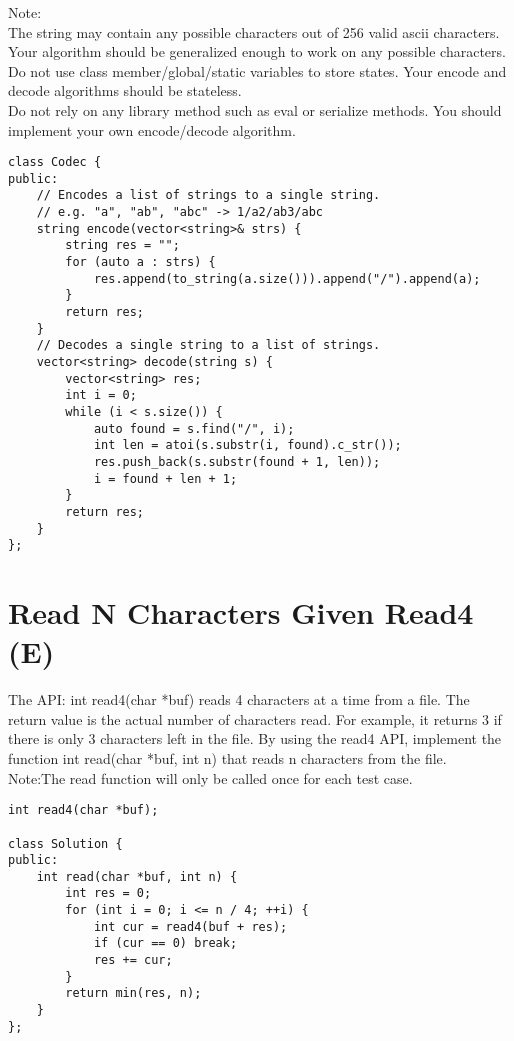 Note:\\
    The string may contain any possible characters out of 256 valid ascii characters. Your algorithm should be generalized enough to work on any possible characters.\\
    Do not use class member/global/static variables to store states. Your encode and decode algorithms should be stateless.\\
    Do not rely on any library method such as eval or serialize methods. You should implement your own encode/decode algorithm.\\

\begin{lstlisting}
class Codec {
public:
    // Encodes a list of strings to a single string.
    // e.g. "a", "ab", "abc" -> 1/a2/ab3/abc
    string encode(vector<string>& strs) {
        string res = "";
        for (auto a : strs) {
            res.append(to_string(a.size())).append("/").append(a);
        }
        return res;
    }
    // Decodes a single string to a list of strings.
    vector<string> decode(string s) {
        vector<string> res;
        int i = 0;
        while (i < s.size()) {
            auto found = s.find("/", i);
            int len = atoi(s.substr(i, found).c_str());
            res.push_back(s.substr(found + 1, len));
            i = found + len + 1;
        }
        return res;
    }
};
\end{lstlisting}


\section{Read N Characters Given Read4 (E)}
The API: int read4(char *buf) reads 4 characters at a time from a file. The return value is the actual number of characters read. For example, it returns 3 if there is only 3 characters left in the file. By using the read4 API, implement the function int read(char *buf, int n) that reads n characters from the file.\\

Note:The read function will only be called once for each test case.\\

\begin{lstlisting}
int read4(char *buf);

class Solution {
public:
    int read(char *buf, int n) {
        int res = 0;
        for (int i = 0; i <= n / 4; ++i) {
            int cur = read4(buf + res);
            if (cur == 0) break;
            res += cur;
        }
        return min(res, n);
    }
};
\end{lstlisting}


